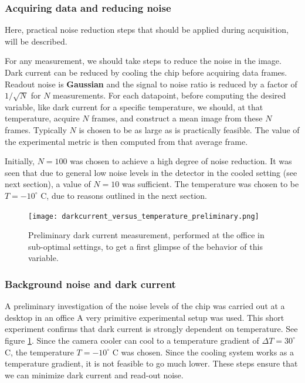 \documentclass[../main.tex]{subfiles}
\begin{document}
	\subsubsection{Acquiring data and reducing noise}
	Here, practical noise reduction steps that should be applied during acquisition, will be described. 
	
	For any measurement, we should take steps to reduce the noise in the image. Dark current can be reduced by cooling the chip before acquiring data frames. Readout noise is \textbf{Gaussian} and the signal to noise ratio is reduced by a factor of $1/\sqrt{N}$ for $N$ measurements. For each datapoint, before computing the desired variable, like dark current for a specific temperature, we should, at that temperature, acquire $N$ frames, and construct a mean image from these $N$ frames. Typically $N$ is chosen to be as large as is practically feasible. The value of the experimental metric is then computed from that average frame. 
	
	Initially, $N = 100$ was chosen to achieve a high degree of noise reduction. It was seen that due to general low noise levels in the detector in the cooled setting (see next section), a value of $N = 10$ was sufficient. The temperature was chosen to be $T = -10^\circ$ C, due to reasons outlined in the next section.
	
	\begin{figure}[h!]
		\centering
		\texttt{[image: darkcurrent\_versus\_temperature\_preliminary.png]}
		\caption{Preliminary dark current measurement, performed at the office in sub-optimal settings, to get a first glimpse of the behavior of this variable.}
		\label{fig:dcprelim}
	\end{figure}
		\subsubsection{Background noise and dark current}
		A preliminary investigation of the noise levels of the chip was carried out at a desktop in an office A very primitive experimental setup was used. This short experiment confirms that dark current is strongly dependent on temperature. See figure \ref{fig:dcprelim}. Since the camera cooler can cool to a temperature gradient of $\Delta T = 30 ^\circ $C, the temperature $T = -10 ^\circ$ C was chosen. Since the cooling system works as a temperature gradient, it is not feasible to go much lower. These steps ensure that we can minimize dark current and read-out noise.
		
\end{document}
